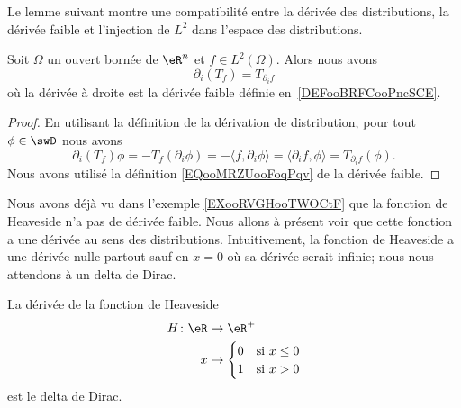 Le lemme suivant montre une compatibilité entre la dérivée des distributions, la dérivée faible et l'injection de \( L^2\) dans l'espace des distributions.

\begin{lemma}       \label{LEMooQRUOooWVjCAV}
	Soit \( \Omega\) un ouvert bornée de \( \eR^n\) et \( f\in L^2(\Omega)\). Alors nous avons
	\begin{equation}
		\partial_i(T_f)=T_{\partial_if}
	\end{equation}
	où la dérivée à droite est la dérivée faible définie en~\ref{DEFooBRFCooPncSCE}.
\end{lemma}

\begin{proof}
	En utilisant la définition de la dérivation de distribution, pour tout \( \phi\in \swD\) nous avons
	\begin{equation}
		\partial_i(T_f)\phi=-T_f(\partial_i\phi)=-\langle f, \partial_i\phi\rangle =\langle \partial_if, \phi\rangle =T_{\partial_if}(\phi).
	\end{equation}
	Nous avons utilisé la définition \eqref{EQooMRZUooFoqPqv} de la dérivée faible.
\end{proof}

Nous avons déjà vu dans l'exemple \ref{EXooRVGHooTWOCtF} que la fonction de Heaveside n'a pas de dérivée faible. Nous allons à présent voir que cette fonction a une dérivée au sens des distributions. Intuitivement, la fonction de Heaveside a une dérivée nulle partout sauf en \( x=0\) où sa dérivée serait infinie; nous nous attendons à un delta de Dirac.

\begin{proposition}     \label{PROPooVUDVooAlwZzB}
	La dérivée de la fonction de Heaveside
	\begin{equation}
		\begin{aligned}
			H\colon \eR & \to \eR^+                      \\
			x           & \mapsto \begin{cases}
				                      0 & \text{si } x\leq 0 \\
				                      1 & \text{si }x>0
			                      \end{cases}
		\end{aligned}
	\end{equation}
	est le delta de Dirac.
\end{proposition}

